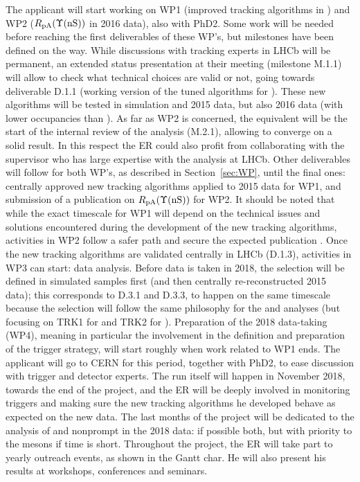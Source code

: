\documentclass[a4paper,11pt]{article}
\newcommand{\ER}{ER\xspace}
\newcommand{\supervisor}{the supervisor\xspace}
\begin{document}
The applicant will start working on WP1 (improved tracking algorithms in \pbpb) and WP2 ($R_{\text{pA}}(\Upsilon\text{(nS)})$ in 2016 \pPb data), also with PhD2. Some work will be needed before reaching the first deliverables of these WP's, but milestones have been defined on the way. While discussions with tracking experts in LHCb will be permanent, an extended status presentation at their meeting (milestone M.1.1) will allow to check what technical choices are valid or not, going towards deliverable D.1.1 (working version of the tuned algorithms for \pbpb). These new algorithms will be tested in \pbpb simulation and 2015 data, but also 2016 \pPb data (with lower occupancies than \pbpb). As far as WP2 is concerned, the equivalent will be the start of the internal review of the analysis (M.2.1), allowing to converge on a solid result. In this respect the \ER could also profit from collaborating with \supervisor who has large expertise with the \PgU analysis at LHCb. Other deliverables will follow for both WP's, as described in Section~\ref{sec:WP}, until the final ones: centrally approved new \pbpb tracking algorithms applied to 2015 \pbpb data for WP1, and submission of a publication on $R_{\text{pA}}(\Upsilon\text{(nS)})$ for WP2. It should be noted that while the exact timescale for WP1 will depend on the technical issues and solutions encountered during the development of the new tracking algorithms, activities in WP2 follow a safer path and secure the expected publication .
%
Once the new tracking algorithms are validated centrally in LHCb (D.1.3), activities in WP3 can start: \pbpb data analysis. Before \pbpb data is taken in 2018, the selection will be defined in simulated samples first (and then centrally re-reconstructed 2015 \pbpb data); this corresponds to D.3.1 and D.3.3, to happen on the same timescale because the selection will follow the same philosophy for the \Dz and \JPsi analyses (but focusing on TRK1 for \Dz and TRK2 for \JPsi). Preparation of the 2018 \pbpb data-taking (WP4), meaning in particular the involvement in the definition and preparation of the trigger strategy, will start roughly when work related to WP1 ends. The applicant will go to CERN for this period, together with PhD2, to ease discussion with trigger and detector experts. The \pbpb run itself will happen in November 2018, towards the end of the project, and the \ER will be deeply involved in monitoring triggers and making sure the new \pbpb tracking algorithms he developed behave as expected on the new data. The last months of the project will be dedicated to the analysis of \Dz and nonprompt \JPsi in the 2018 \pbpb data: if possible both, but with priority to the \Dz mesons if time is short.
%
Throughout the project, the \ER will take part to yearly outreach events, as shown in the Gantt char. He will also present his results at workshops, conferences and seminars.
\end{document}
